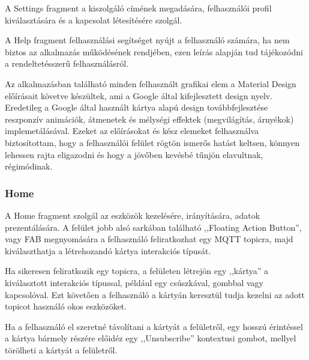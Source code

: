 \documentclass[]{thesis-ekf}
\theoremstyle{definition}
\theoremstyle{remark}
\begin{document}
A Settings fragment a kiszolgáló címének megadására, felhasználói profil kiválasztására és a kapcsolat létesítésére
szolgál.

A Help fragment felhasználási segítséget nyújt a felhasználó számára, ha nem biztos az alkalmazás működésének rendjében,
ezen leírás alapján tud tájékozódni a rendeltetésszerű felhasználásról.

Az alkalmazásban található minden felhasznált grafikai elem a Material Design\cite{material} előírásait követve készültek,
ami a Google által kifejlesztett design nyelv. Eredetileg a Google által használt kártya alapú design továbbfejlesztése
reszponzív animációk, átmenetek és mélységi effektek (megvilágítás, árnyékok) implemetálásával. Ezeket az előírásokat és
kész elemeket felhasználva biztosítottam, hogy a felhasználói felület rögtön ismerős hatást keltsen, könnyen lehessen rajta
eligazodni és hogy a jövőben kevésbé tűnjön elavultnak, régimódinak.


\subsubsection{Home}
A Home fragment szolgál az eszközök kezelésére, irányítására, adatok prezentálására.
A felület jobb alsó sarkában található ,,Floating Action Button'', vagy FAB megnyomására a felhasználó feliratkozhat egy MQTT
topicra, majd kiválaszthatja a létrehozandó kártya interakciós típusát. 

Ha sikeresen feliratkozik egy topicra, a felületen létrejön
egy ,,kártya'' a kiválasztott interakciós típussal, például egy csúszkával, gombbal vagy kapcsolóval. Ezt követően a felhasználó a
kártyán keresztül tudja kezelni az adott topicot használó okos eszközöket. 

Ha a felhasználó el szeretné távolítani a kártyát a felületről,
egy hosszú érintéssel a kártya bármely részére előidéz egy ,,Unsubscribe'' kontextusi gombot, mellyel törölheti a kártyát a felületről.
\end{document}
